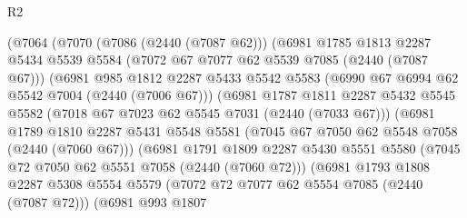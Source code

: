 \begin{lexlean}{R2}
\begin{coremodule}
                          (@7064
                            (@7070
                              (@7086 (@2440 (@7087 @62)))
                              (@6981
                                @1785
                                @1813
                                @2287
                                @5434
                                @5539
                                @5584
                                (@7072 @67 @7077 @62 @5539 @7085 (@2440 (@7087 @67)))
                                (@6981
                                  @985
                                  @1812
                                  @2287
                                  @5433
                                  @5542
                                  @5583
                                  (@6990 @67 @6994 @62 @5542 @7004 (@2440 (@7006 @67)))
                                  (@6981
                                    @1787
                                    @1811
                                    @2287
                                    @5432
                                    @5545
                                    @5582
                                    (@7018 @67 @7023 @62 @5545 @7031 (@2440 (@7033 @67)))
                                    (@6981
                                      @1789
                                      @1810
                                      @2287
                                      @5431
                                      @5548
                                      @5581
                                      (@7045 @67 @7050 @62 @5548 @7058 (@2440 (@7060 @67)))
                                      (@6981
                                        @1791
                                        @1809
                                        @2287
                                        @5430
                                        @5551
                                        @5580
                                        (@7045 @72 @7050 @62 @5551 @7058 (@2440 (@7060 @72)))
                                        (@6981
                                          @1793
                                          @1808
                                          @2287
                                          @5308
                                          @5554
                                          @5579
                                          (@7072 @72 @7077 @62 @5554 @7085 (@2440 (@7087 @72)))
                                          (@6981
                                            @993
                                            @1807

\end{coremodule}
\end{lexlean}
